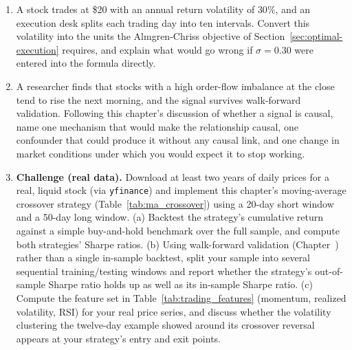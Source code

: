 \documentclass[../ai_in_finance]{subfiles}
\begin{document}
\begin{enumerate}[exercises]
    \item A stock trades at \$20 with an annual return volatility of $30\%$, and an execution desk splits each trading day into ten intervals. Convert this volatility into the units the Almgren-Chriss objective of Section~\ref{sec:optimal-execution} requires, and explain what would go wrong if $\sigma=0.30$ were entered into the formula directly.
    \item A researcher finds that stocks with a high order-flow imbalance at the close tend to rise the next morning, and the signal survives walk-forward validation. Following this chapter's discussion of whether a signal is causal, name one mechanism that would make the relationship causal, one confounder that could produce it without any causal link, and one change in market conditions under which you would expect it to stop working.
    \item \textbf{Challenge (real data).} Download at least two years of daily prices for a real, liquid stock (via \texttt{yfinance}) and implement this chapter's moving-average crossover strategy (Table~\ref{tab:ma_crossover}) using a 20-day short window and a 50-day long window. (a) Backtest the strategy's cumulative return against a simple buy-and-hold benchmark over the full sample, and compute both strategies' Sharpe ratios. (b) Using walk-forward validation (Chapter~) rather than a single in-sample backtest, split your sample into several sequential training/testing windows and report whether the strategy's out-of-sample Sharpe ratio holds up as well as its in-sample Sharpe ratio. (c) Compute the feature set in Table~\ref{tab:trading_features} (momentum, realized volatility, RSI) for your real price series, and discuss whether the volatility clustering the twelve-day example showed around its crossover reversal appears at your strategy's entry and exit points.
\end{enumerate}

\end{document}
